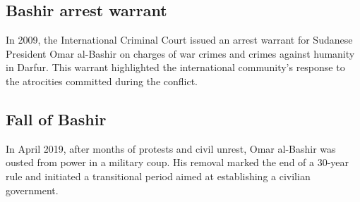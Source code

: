 \documentclass[14pt,a4paper]{article}
\begin{document}
\subsection{Bashir arrest warrant}
In 2009, the International Criminal Court issued an arrest warrant for Sudanese President Omar al-Bashir on charges of war crimes and crimes against humanity in Darfur. This warrant highlighted the international community's response to the atrocities committed during the conflict.

\subsection{Fall of Bashir}
In April 2019, after months of protests and civil unrest, Omar al-Bashir was ousted from power in a military coup. His removal marked the end of a 30-year rule and initiated a transitional period aimed at establishing a civilian government.

\newpage


\end{document}
